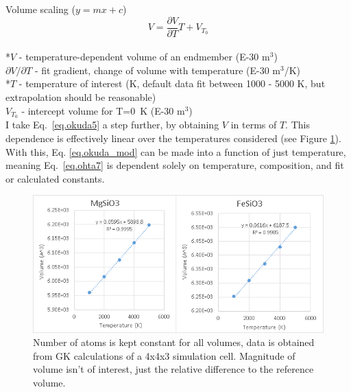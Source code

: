 Volume scaling ($y=mx+c$)  
\begin{equation}%
V=\frac{\partial V}{\partial T} T+V_{T_{0}}
\label{eq.vol_scale}
\end{equation}%
\\ *$V$ - temperature-dependent volume of an endmember (E-30 m$^3$)\\          
${\partial V}/{\partial T}$ - fit gradient, change of volume with temperature (E-30 m$^3$/K)\\
*$T$ - temperature of interest (K, default data fit between 1000 - 5000 K, but extrapolation should be reasonable)\\
$V_{T_{0}}$ - intercept volume for T=0~K (E-30 m$^3$)\\

I take Eq.~\ref{eq.okuda5} \citep[][Eq. 5]{Okuda2017} a step further, by obtaining $V$ in terms of $T$. This dependence is effectively linear over the temperatures considered (see Figure \ref{fig:draft_vt}). With this, Eq. \ref{eq.okuda_mod} can be made into a function of just temperature, meaning Eq.~\ref{eq.ohta7} \citep[][Eq. 7]{Ohta2017} is dependent solely on temperature, composition, and fit or calculated constants.

\begin{figure}[h]
  \includegraphics[width=\linewidth]{Figures/draft_VT.png}
  \caption{Number of atoms is kept constant for all volumes, data is obtained from GK calculations of a 4x4x3 simulation cell. Magnitude of volume isn't of interest, just the relative difference to the reference volume.}
  \label{fig:draft_vt}
\end{figure}


